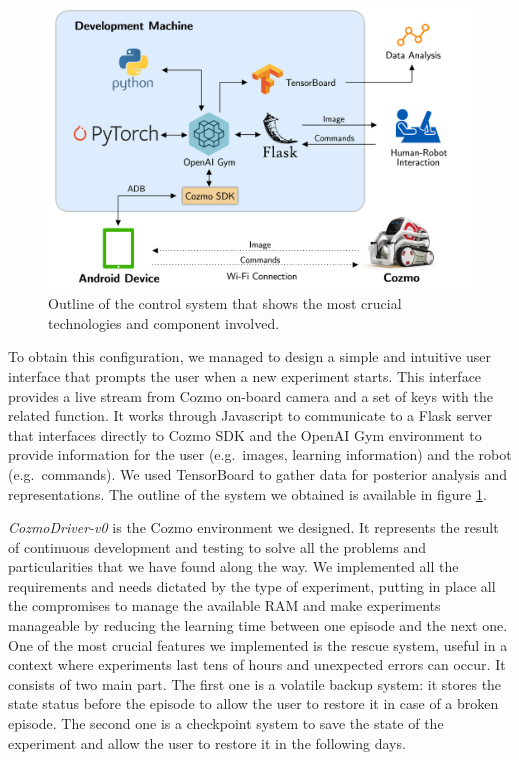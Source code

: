\documentclass[10pt,twocolumn,letterpaper]{article}
\begin{document}
\begin{figure}[tbp]
    \centering
    \includegraphics[width=0.97\columnwidth]{cozmo-system.png}
    \caption[Outline of the control system]{Outline of the control system that shows the most crucial technologies and component involved.}
    \label{system}
\end{figure}

To obtain this configuration, we managed to design a simple and intuitive user interface that prompts the user when a new experiment starts. This interface provides a live stream from Cozmo on-board camera and a set of keys with the related function. It works through Javascript to communicate to a Flask server that interfaces directly to Cozmo SDK and the OpenAI Gym environment to provide information for the user (e.g.\ images, learning information) and the robot (e.g.\ commands). We used TensorBoard to gather data for posterior analysis and representations. The outline of the system we obtained is available in figure \ref{system}.

\textit{CozmoDriver-v0} is the Cozmo environment we designed. It represents the result of continuous development and testing to solve all the problems and particularities that we have found along the way. We implemented all the requirements and needs dictated by the type of experiment, putting in place all the compromises to manage the available RAM and make experiments manageable by reducing the learning time between one episode and the next one.
One of the most crucial features we implemented is the rescue system, useful in a context where experiments last tens of hours and unexpected errors can occur.
It consists of two main part. The first one is a volatile backup system: it stores the state status before the episode to allow the user to restore it in case of a broken episode. The second one is a checkpoint system to save the state of the experiment and allow the user to restore it in the following days.
%
\end{document}
